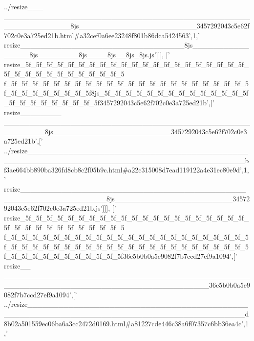 \begin{DoxyCode}
{      ../resize\_\_\_
      \_\_\_\_\_\_\_\_\_\_\_\_\_\_\_\_\_\_\_\_\_\_\_\_\_\_\_\_\_\_\_\_\_\_\_\_\_\_\_\_\_\_\_\_\_\_\_\_\_\_\_\_\_\_\_\_\_\_\_\_\_8js\_\_\_\_\_\_\_\_\_\_\_\_\_\_\_\_\_\_\_\_\_\_\_3457292043c5e62f702c0e3a725ed21b.html#a32cef0a6ee23248f801b86dca5424563'},1,\textcolor{stringliteral}{'
      resize\_\_\_\_\_\_\_\_\_\_\_\_\_\_\_\_\_\_\_\_\_\_\_\_\_\_\_\_\_\_\_\_8js\_\_\_\_\_\_\_\_\_\_\_\_\_\_\_\_8js\_\_\_\_\_\_\_\_8js\_\_\_\_8js\_\_8js\_8js.js'}]]],
  [\textcolor{stringliteral}{'
      resize\_5f\_5f\_5f\_5f\_5f\_5f\_5f\_5f\_5f\_5f\_5f\_5f\_5f\_5f\_5f\_5f\_5f\_5f\_5f\_5f\_5f\_5f\_5f\_5f\_5f\_5f\_5f\_5f\_5f\_5f\_5f\_5f\_5
      f\_5f\_5f\_5f\_5f\_5f\_5f\_5f\_5f\_5f\_5f\_5f\_5f\_5f\_5f\_5f\_5f\_5f\_5f\_5f\_5f\_5f\_5f\_5f\_5f\_5f\_5f\_5f\_5f\_5f\_5f\_5f8js\_5f\_5f\_5f\_5f\_5f\_5f\_5f\_5f\_5f\_5f\_5f\_5f\_5f\_5f\_5f\_5f\_5f\_5f\_5f\_5f\_5f\_5f\_5f3457292043c5e62f702c0e3a725ed21b'},[\textcolor{stringliteral}{'
      resize\_\_\_\_\_\_\_\_
      \_\_\_\_\_\_\_\_\_\_\_\_\_\_\_\_\_\_\_\_\_\_\_\_\_\_\_\_\_\_\_\_\_\_\_\_\_\_\_\_\_\_\_\_\_\_\_\_\_\_\_\_\_\_\_\_8js\_\_\_\_\_\_\_\_\_\_\_\_\_\_\_\_\_\_\_\_\_\_\_3457292043c5e62f702c0e3a725ed21b'},[\textcolor{stringliteral}{'
      ../resize\_\_\_\_\_\_\_\_\_\_\_\_\_\_\_\_\_\_\_\_\_\_\_\_\_\_\_\_\_\_\_\_\_\_\_\_\_\_\_\_\_\_\_\_\_\_\_\_\_\_\_\_\_\_\_\_\_\_\_\_\_\_\_\_\_\_\_\_\_\_\_\_\_\_\_\_\_\_\_\_\_\_\_\_\_\_\_\_\_\_bf3ae664bb890ba326fd8cb8c2f05b9c.html#a22c315008d7ead119122a4e31ec80e9d'},1,\textcolor{stringliteral}{'
      resize\_\_\_\_\_\_\_\_\_\_\_\_\_\_\_\_\_\_\_\_\_\_\_\_\_\_\_\_\_\_\_\_\_\_\_\_\_\_\_\_\_\_\_\_\_\_\_\_\_\_\_\_\_\_\_\_\_\_\_\_\_\_\_\_8js\_\_\_\_\_\_\_\_\_\_\_\_\_\_\_\_\_\_\_\_\_\_\_3457292043c5e62f702c0e3a725ed21b.js'}]]],
  [\textcolor{stringliteral}{'
      resize\_5f\_5f\_5f\_5f\_5f\_5f\_5f\_5f\_5f\_5f\_5f\_5f\_5f\_5f\_5f\_5f\_5f\_5f\_5f\_5f\_5f\_5f\_5f\_5f\_5f\_5f\_5f\_5f\_5f\_5f\_5f\_5f\_5
      f\_5f\_5f\_5f\_5f\_5f\_5f\_5f\_5f\_5f\_5f\_5f\_5f\_5f\_5f\_5f\_5f\_5f\_5f\_5f\_5f\_5f\_5f\_5f\_5f\_5f\_5f\_5f\_5f\_5f\_5f\_5f\_5f\_5f\_5f\_5f\_5f\_5f\_5f\_5f\_5f\_5f\_5f\_5f\_5f\_5f\_5f\_5f\_5f\_5f\_5f\_5f\_5f\_5f\_5f\_5f\_5f\_5f36e5b0b0a5e9082f7b7ccd27ef9a1094'},[\textcolor{stringliteral}{'
      resize\_\_
      \_\_\_\_\_\_\_\_\_\_\_\_\_\_\_\_\_\_\_\_\_\_\_\_\_\_\_\_\_\_\_\_\_\_\_\_\_\_\_\_\_\_\_\_\_\_\_\_\_\_\_\_\_\_\_\_\_\_\_\_\_\_\_\_\_\_\_\_\_\_\_\_\_\_\_\_\_\_\_\_\_\_\_\_\_\_\_\_36e5b0b0a5e9082f7b7ccd27ef9a1094'},[\textcolor{stringliteral}{'
      ../resize\_\_\_\_\_\_\_\_\_\_\_\_\_\_\_\_\_\_\_\_\_\_\_\_\_\_\_\_\_\_\_\_\_\_\_\_\_\_\_\_\_\_\_\_\_\_\_\_\_\_\_\_\_\_\_\_\_\_\_\_\_\_\_\_\_\_\_\_\_\_\_\_\_\_\_\_\_\_\_\_\_\_\_\_\_\_\_\_\_\_d8b02a501559ec06ba6a3cc2472d0169.html#a81227cde446c38a6f07357c6bb36ea4c'},1,\textcolor{stringliteral}{'
}
\end{DoxyCode}
